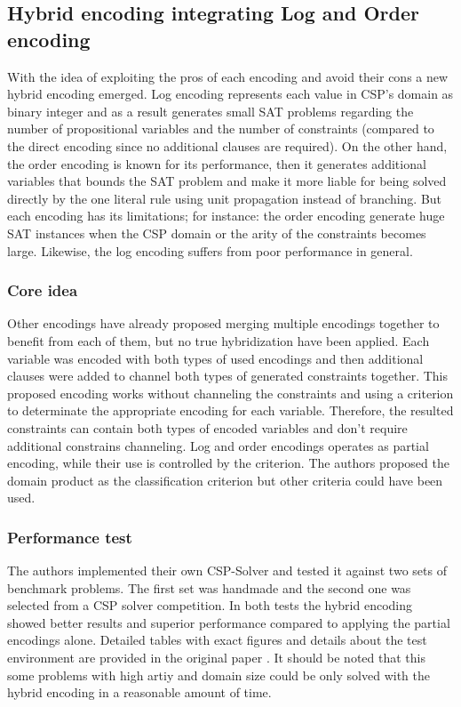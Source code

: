 \subsection{Hybrid encoding integrating Log and Order encoding}
With the idea of exploiting the pros of each encoding and avoid their cons a new hybrid encoding emerged. Log encoding represents each value in CSP's domain as binary integer and as a result generates small SAT problems regarding the number of propositional variables and the number of constraints (compared to the direct encoding since no additional clauses are required). On the other hand, the order encoding is known for its performance, then it generates additional variables that bounds the SAT problem and make it more liable for being solved directly by the one literal rule using unit propagation instead of branching. But each encoding has its limitations; for instance: the order encoding generate huge SAT instances when the CSP domain or the arity of the constraints becomes large. Likewise, the log encoding suffers from poor performance in general.

\subsubsection{Core idea}
Other encodings have already proposed merging multiple encodings together to benefit from each of them, but no true hybridization have been applied. Each variable was encoded with both types of used encodings and then additional clauses were added to channel both types of generated constraints together. This proposed encoding works without channeling the constraints and using a criterion to determinate the appropriate encoding for each variable. Therefore, the resulted constraints can contain both types of encoded variables and don't require additional constrains channeling. Log and order encodings operates as partial encoding, while their use is controlled by the criterion. The authors proposed the domain product as the classification criterion but other criteria could have been used. \cite{soh2015hybrid}

\subsubsection{Performance test}
The authors implemented their own CSP-Solver and tested it against two sets of benchmark problems. The first set was handmade and the second one was selected from a CSP solver competition. In both tests the hybrid encoding showed better results and superior performance compared to applying the partial encodings alone. Detailed tables with exact figures and details about the test environment are provided in the original paper \cite{soh2015hybrid}. It should be noted that this some problems with high artiy and domain size could be only solved with the hybrid encoding in a reasonable amount of time.

